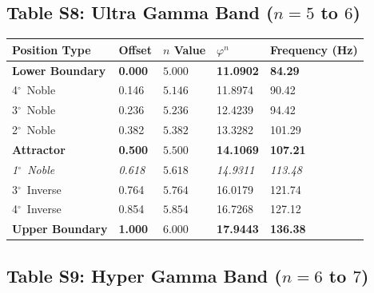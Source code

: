 \documentclass[11pt,a4paper]{article}
\newcommand{\degree}{$^\circ$}  %
\newcommand{\phisym}{\varphi}
\begin{document}
\subsection*{Table S8: Ultra Gamma Band ($n = 5$ to $6$)}

\begin{table}[H]
\centering
\begin{tabular}{@{}lllll@{}}
\toprule
Position Type & Offset & $n$ Value & $\phisym^n$ & Frequency (Hz) \\
\midrule
\textbf{Lower Boundary} & \textbf{0.000} & $\mathbf{5.000}$ & \textbf{11.0902} & \textbf{84.29} \\
4\degree\ Noble & 0.146 & $5.146$ & 11.8974 & 90.42 \\
3\degree\ Noble & 0.236 & $5.236$ & 12.4239 & 94.42 \\
2\degree\ Noble & 0.382 & $5.382$ & 13.3282 & 101.29 \\
\textbf{Attractor} & \textbf{0.500} & $\mathbf{5.500}$ & \textbf{14.1069} & \textbf{107.21} \\
\textit{1\degree\ Noble} & \textit{0.618} & $5.618$ & \textit{14.9311} & \textit{113.48} \\
3\degree\ Inverse & 0.764 & $5.764$ & 16.0179 & 121.74 \\
4\degree\ Inverse & 0.854 & $5.854$ & 16.7268 & 127.12 \\
\textbf{Upper Boundary} & \textbf{1.000} & $\mathbf{6.000}$ & \textbf{17.9443} & \textbf{136.38} \\
\bottomrule
\end{tabular}
\end{table}

\subsection*{Table S9: Hyper Gamma Band ($n = 6$ to $7$)}
\end{document}
